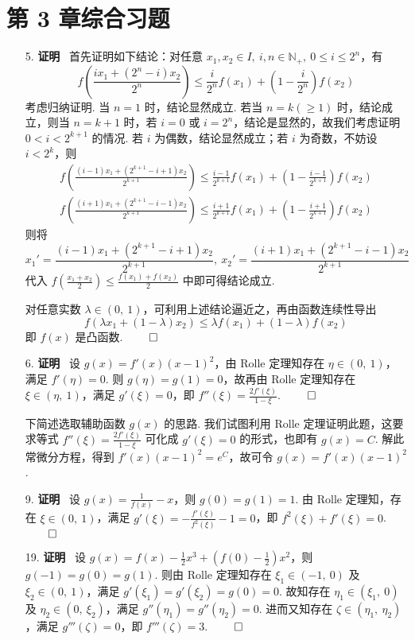 \documentclass[11pt,oneside,fontset=fandol]{ctexbook} %
\begin{document}
\section*{第 3 章综合习题}

\begin{enumerate}
    \item[5.]
    \textbf{证明} \ 首先证明如下结论：对任意 $x_1, x_2 \in I,\ i, n \in \mathbb N_+,\ 0 \leqslant i \leqslant 2^n$，有
    \[
        f\left( \frac{ix_1+(2^n-i)x_2}{2^n} \right) \leqslant \frac i {2^n} f(x_1) + \left( 1 - \frac i {2^n} \right) f(x_2)
    \]
    考虑归纳证明. 当 $n = 1$ 时，结论显然成立.
    若当 $n = k (\geqslant 1)$ 时，结论成立，则当 $n = k + 1$ 时，若 $i = 0$ 或 $i = 2^n$，结论是显然的，故我们考虑证明 $0 < i < 2^{k+1}$ 的情况. 若 $i$ 为偶数，结论显然成立；若 $i$ 为奇数，不妨设 $i < 2^k$，则
    \begin{align*}
        f\left( \frac{(i-1)x_1+(2^{k+1}-i+1)x_2}{2^{k+1}} \right) \leqslant \frac {i-1} {2^{k+1}} f(x_1) + \left( 1 - \frac {i-1} {2^{k+1}} \right) f(x_2) \\
        f\left( \frac{(i+1)x_1+(2^{k+1}-i-1)x_2}{2^{k+1}} \right) \leqslant \frac {i+1} {2^{k+1}} f(x_1) + \left( 1 - \frac {i+1} {2^{k+1}} \right) f(x_2)
    \end{align*}
    则将
    \[
        x_1' = \frac{(i-1)x_1+(2^{k+1}-i+1)x_2}{2^{k+1}},\ x_2' = \frac{(i+1)x_1+(2^{k+1}-i-1)x_2}{2^{k+1}}
    \]
    代入 $f\left( \frac {x_1+x_2} 2 \right) \leqslant \frac {f(x_1)+f(x_2)} 2$ 中即可得结论成立.

    对任意实数 $\lambda \in (0,\ 1)$，可利用上述结论逼近之，再由函数连续性导出
    \[
        f(\lambda x_1 + (1 - \lambda) x_2) \leqslant \lambda f(x_1) + (1 - \lambda) f(x_2)
    \]
    即 $f(x)$ 是凸函数.
    $\hfill\qed$
    \item[6.]
    \textbf{证明} \ 设 $g(x) = f'(x)(x-1)^2$，由 Rolle 定理知存在 $\eta \in (0,\ 1)$，满足 $f'(\eta) = 0$. 则 $g(\eta) = g(1) = 0$，故再由 Rolle 定理知存在 $\xi \in (\eta,\ 1)$，满足 $g'(\xi) = 0$，即 $f''(\xi) = \frac{2f'(\xi)}{1-\xi}$.
    $\hfill\qed$

    下简述选取辅助函数 $g(x)$ 的思路. 我们试图利用 Rolle 定理证明此题，这要求等式 $f''(\xi) = \frac{2f'(\xi)}{1-\xi}$ 可化成 $g'(\xi) = 0$ 的形式，也即有 $g(x) = C$. 解此常微分方程，得到 $f'(x)(x-1)^2 = e^C$，故可令 $g(x) = f'(x)(x-1)^2$.
    \item[9.]
    \textbf{证明} \ 设 $g(x) = \frac 1 {f(x)} - x$，则 $g(0) = g(1) = 1$. 由 Rolle 定理知，存在 $\xi \in (0,\ 1)$，满足 $g'(\xi) = - \frac{f'(\xi)}{f^2(\xi)} - 1 = 0$，即 $f^2(\xi) + f'(\xi) = 0$.
    $\hfill\qed$
    \item[19.]
    \textbf{证明} \ 设 $g(x) = f(x) - \frac 1 2 x^3 + \left( f(0) - \frac 1 2 \right) x^2$，则 $g(-1) = g(0) = g(1)$. 则由 Rolle 定理知存在 $\xi_1 \in (-1,\ 0)$ 及 $\xi_2 \in (0,\ 1)$，满足 $g'(\xi_1) = g'(\xi_2) = g(0) = 0$. 故知存在 $\eta_1 \in (\xi_1,\ 0)$ 及 $\eta_2 \in (0,\ \xi_2)$，满足 $g''(\eta_1) = g''(\eta_2) = 0$. 进而又知存在 $\zeta \in (\eta_1,\ \eta_2)$，满足 $g'''(\zeta) = 0$，即 $f'''(\zeta) = 3$.
    $\hfill\qed$


\end{enumerate}
\end{document}
